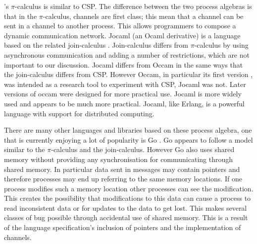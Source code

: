 \citet{milner:pi}'s $\pi$-calculus is similar to CSP.
The difference between the two process algebras is that in the
$\pi$-calculus,
channels are first class;
this mean that a channel can be sent in a channel to another process.
This allows programmers to compose a dynamic communication network.
Jocaml \citep{jocaml} (an Ocaml
\citep{ml-types, ocaml-modules, ocaml-bytecode, ocaml-native}
derivative) is a language based on the related join-calculus
\citep{join-calculus}.
Join-calculus differs from $\pi$-calculus by using asynchronous
communication and adding a number of restrictions,
which are not important to our discussion.
Jocaml differs from Occam in the same ways that the join-calculus differs
from CSP.
However Occam, in particular its first version \citep{occam1},
was intended as a research tool to experiment with CSP, Jocaml was not.
Later versions of occam \citep{occam3} were designed for more practical use.
Jocaml is more widely used and appears to be much more practical.
Jocaml, like Erlang, is a powerful language with support for distributed
computing.

There are many other languages and libraries based on these process algebra,
one that is currently enjoying a lot of popularity is Go
\citep{google:2012:go}.
Go appears to follow a model similar to the $\pi$-calculus and the
join-calculus.
However Go also uses shared memory without providing any synchronisation
for communicating through shared memory.
In particular data sent in messages may contain pointers and therefore
processes may end up referring to the same memory locations.
If one process modifies such a memory location other processes can see the
modification.
This creates the possibility that modifications to this data can 
cause a process to read inconsistent data or for updates to the data to get
lost.
This makes several classes of bug possible through accidental use of
shared memory.
This is a result of the language specification's inclusion of pointers and
the implementation of channels.

